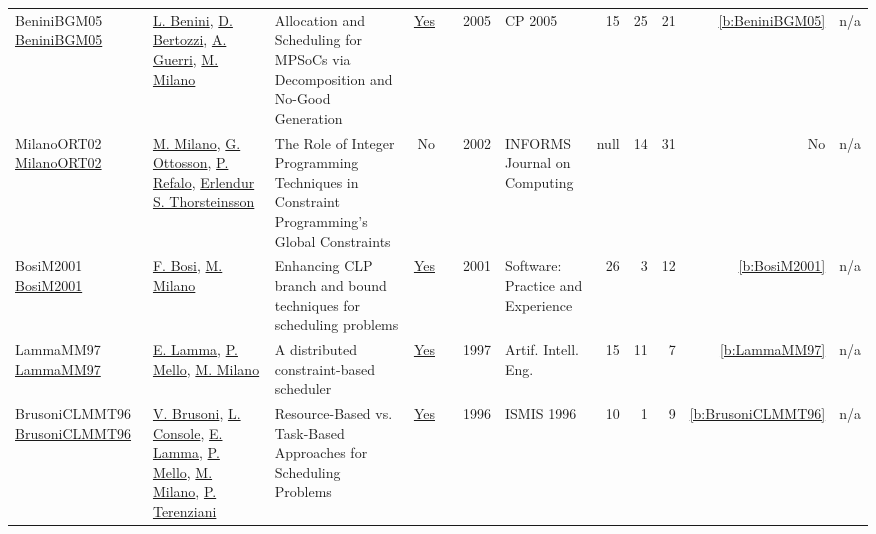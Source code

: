 {\begin{longtable}{>{\raggedright\arraybackslash}p{3cm}>{\raggedright\arraybackslash}p{6cm}>{\raggedright\arraybackslash}p{6.5cm}rrrp{2.5cm}rrrrr}
BeniniBGM05 \href{https://doi.org/10.1007/11564751_11}{BeniniBGM05} & \hyperref[auth:a247]{L. Benini}, \hyperref[auth:a378]{D. Bertozzi}, \hyperref[auth:a379]{A. Guerri}, \hyperref[auth:a144]{M. Milano} & Allocation and Scheduling for MPSoCs via Decomposition and No-Good Generation & \href{../works/BeniniBGM05.pdf}{Yes} & \cite{BeniniBGM05} & 2005 & CP 2005 & 15 & 25 & 21 & \ref{b:BeniniBGM05} & n/a\\
MilanoORT02 \href{http://dx.doi.org/10.1287/ijoc.14.4.387.2830}{MilanoORT02} & \hyperref[auth:a144]{M. Milano}, \hyperref[auth:a859]{G. Ottosson}, \hyperref[auth:a256]{P. Refalo}, \hyperref[auth:a881]{Erlendur S. Thorsteinsson} & The Role of Integer Programming Techniques in Constraint Programming's Global Constraints & No & \cite{MilanoORT02} & 2002 & INFORMS Journal on Computing & null & 14 & 31 & No & n/a\\
BosiM2001 \href{http://dx.doi.org/10.1002/1097-024x(200101)31:1<17::aid-spe355>3.0.co;2-l}{BosiM2001} & \hyperref[auth:a1244]{F. Bosi}, \hyperref[auth:a144]{M. Milano} & Enhancing CLP branch and bound techniques for scheduling problems & \href{../works/BosiM2001.pdf}{Yes} & \cite{BosiM2001} & 2001 & Software: Practice and Experience & 26 & 3 & 12 & \ref{b:BosiM2001} & n/a\\
LammaMM97 \href{https://doi.org/10.1016/S0954-1810(96)00002-7}{LammaMM97} & \hyperref[auth:a726]{E. Lamma}, \hyperref[auth:a727]{P. Mello}, \hyperref[auth:a144]{M. Milano} & A distributed constraint-based scheduler & \href{../works/LammaMM97.pdf}{Yes} & \cite{LammaMM97} & 1997 & Artif. Intell. Eng. & 15 & 11 & 7 & \ref{b:LammaMM97} & n/a\\
BrusoniCLMMT96 \href{https://doi.org/10.1007/3-540-61286-6_157}{BrusoniCLMMT96} & \hyperref[auth:a728]{V. Brusoni}, \hyperref[auth:a729]{L. Console}, \hyperref[auth:a726]{E. Lamma}, \hyperref[auth:a727]{P. Mello}, \hyperref[auth:a144]{M. Milano}, \hyperref[auth:a730]{P. Terenziani} & Resource-Based vs. Task-Based Approaches for Scheduling Problems & \href{../works/BrusoniCLMMT96.pdf}{Yes} & \cite{BrusoniCLMMT96} & 1996 & ISMIS 1996 & 10 & 1 & 9 & \ref{b:BrusoniCLMMT96} & n/a\\
\end{longtable}
}

\clearpage
